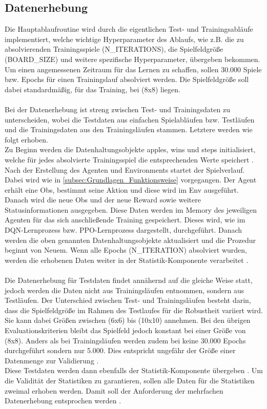 \subsection{Datenerhebung} \label{subsec:Konzept_Datenerhebung}
Die Hauptablaufroutine wird durch die eigentlichen Test- und Trainingsabläufe implementiert, welche
wichtige Hyperparameter des Ablaufs, wie z.B. die zu absolvierenden Trainingsspiele (N\_ITERATIONS), die Spielfeldgröße (BOARD\_SIZE) und weitere spezifische Hyperparameter, übergeben bekommen. Um einen angemessenen Zeitraum für das Lernen zu schaffen, sollen 30.000 Spiele bzw. Epochs für einen Trainingslauf absolviert werden. Die Spielfeldgröße soll dabei standardmäßig, für das Training, bei (8x8) liegen.\\
\\Bei der Datenerhebung ist streng zwischen Test- und Trainingsdaten zu unterscheiden, wobei die Testdaten aus einfachen Spielabläufen bzw. Testläufen und die Trainingsdaten aus den Trainingsläufen stammen. Letztere werden wie folgt erhoben.\\
Zu Beginn werden die Datenhaltungsobjekte apples, wins und steps initialisiert, welche für jedes absolvierte Trainingsspiel die entsprechenden Werte speichert . 
Nach der Erstellung des Agenten und Environments startet der Spielverlauf.\\
Dabei wird wie in \autoref{subsec:Grundlagen_Funktionsweise} vorgegangen. Der Agent erhält eine Obs, bestimmt seine Aktion und diese wird im Env ausgeführt. Danach wird die neue Obs und der neue Reward sowie weitere Statusinformationen ausgegeben. Diese Daten werden im Memory des jeweiligen Agenten für das sich anschließende Training gespeichert. Dieses wird, wie im DQN-Lernprozess  bzw. PPO-Lernprozess  dargestellt, durchgeführt. 
Danach werden die oben genannten Datenhaltungsobjekte aktualisiert und die Prozedur beginnt von Neuem. Wenn alle Epochs (N\_ITERATION) absolviert wurden, werden die erhobenen Daten weiter in der Statistik-Komponente verarbeitet .\\
\\Die Datenerhebung für Testdaten findet annähernd auf die gleiche Weise statt, jedoch werden die Daten nicht aus Trainingsläufen entnommen, sondern aus Testläufen. Der Unterschied zwischen Test- und Trainingsläufen besteht darin, dass die Spielfeldgröße im Rahmen des Testlaufes für die Robustheit variiert wird. Sie kann dabei Größen zwischen (6x6) bis (10x10) annehmen. Bei den übrigen Evaluationskriterien bleibt das Spielfeld jedoch konstant bei einer Größe von (8x8). Anders als bei Trainingsläufen werden zudem bei keine 30.000 Epochs durchgeführt sondern nur 5.000. Dies entspricht ungefähr der Größe einer Datenmenge zur Validierung \cite[S. 134]{DL}.\\
Diese Testdaten werden dann ebenfalls der Statistik-Komponente übergeben .
Um die Validität der Statistiken zu garantieren, sollen alle Daten für die Statistiken zweimal erhoben werden. Damit soll der Anforderung der mehrfachen Datenerhebung entsprochen werden . 

